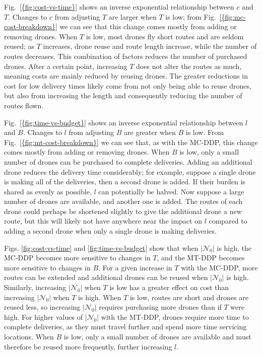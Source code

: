 \documentclass[journal]{IEEEtran}
\begin{document}
{Fig.~\ref{{fig:cost-vs-time}}} shows an inverse exponential relationship between $c$ and $T$. Changes to ${\ensuremath{c}}$ from adjusting ${\ensuremath{T}}$ are larger when ${\ensuremath{T}}$ is low; from {Fig.~\ref{{fig:mc-cost-breakdown}}} we can see that this change comes mostly from adding or removing drones. When ${\ensuremath{T}}$ is low, most drones fly short routes and are seldom reused; as ${\ensuremath{T}}$ increases, drone reuse and route length increase, while the number of routes decreases. This combination of factors reduces the number of purchased drones. After a certain point, increasing ${\ensuremath{T}}$ does not alter the routes as much, meaning costs are mainly reduced by reusing drones. The greater reductions in cost for low delivery times likely come from not only being able to reuse drones, but also from increasing the length and consequently reducing the number of routes flown.

{Fig.~\ref{{fig:time-vs-budget}}} shows an inverse exponential relationship between $l$ and $B$. Changes to ${\ensuremath{l}}$ from adjusting ${\ensuremath{B}}$ are greater when ${\ensuremath{B}}$ is low. From {Fig.~\ref{{fig:mt-cost-breakdown}}} we can see that, as with the MC-DDP, this change comes mostly from adding or removing drones. When ${\ensuremath{B}}$ is low, only a small number of drones can be purchased to complete deliveries. Adding an additional drone reduces the delivery time considerably; for example, suppose a single drone is making all of the deliveries, then a second drone is added. If their burden is shared as evenly as possible, ${\ensuremath{l}}$ can potentially be halved. Now suppose a large number of drones are available, and another one is added. The routes of each drone could perhaps be shortened slightly to give the additional drone a new route, but this will likely not have anywhere near the impact on ${\ensuremath{l}}$ compared to adding a second drone when only a single drone is making deliveries.

Figs. \ref{fig:cost-vs-time} and \ref{fig:time-vs-budget} show that when $|{\ensuremath{{\ensuremath{\mathcal{N}}}_{0}}}{}|$ is high, the MC-DDP becomes more sensitive to changes in ${\ensuremath{T}}$, and the MT-DDP becomes more sensitive to changes in ${\ensuremath{B}}$. For a given increase in ${\ensuremath{T}}$ with the MC-DDP, more routes can be extended and additional drones can be reused when $|{\ensuremath{{\ensuremath{\mathcal{N}}}_{0}}}{}|$ is high. Similarly, increasing $|{\ensuremath{{\ensuremath{\mathcal{N}}}_{0}}}{}|$ when ${\ensuremath{T}}$ is low has a greater effect on cost than increasing $|{\ensuremath{{\ensuremath{\mathcal{N}}}_{0}}}{}|$ when ${\ensuremath{T}}$ is high. When ${\ensuremath{T}}$ is low, routes are short and drones are reused less, so increasing $|{\ensuremath{{\ensuremath{\mathcal{N}}}_{0}}}{}|$ requires purchasing more drones than if ${\ensuremath{T}}$ were high. For higher values of $|{\ensuremath{{\ensuremath{\mathcal{N}}}_{0}}}{}|$ with the MT-DDP, drones require more time to complete deliveries, as they must travel further and spend more time servicing locations. When ${\ensuremath{B}}$ is low, only a small number of drones are available and must therefore be reused more frequently, further increasing ${\ensuremath{l}}$.
\end{document}

